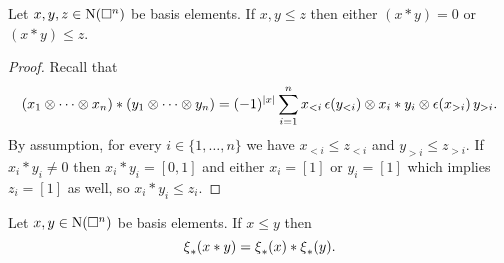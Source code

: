 \begin{lemma}
	Let $x, y, z \in \operatorname{N}(\square^n)$ be basis elements.
	If $x, y \leq z$ then either $(x \ast y) = 0$ or $(x \ast y) \leq z$.
\end{lemma}

\begin{proof}
	Recall that
	\begin{align*}
	(x_1 \otimes \cdots \otimes x_n) \ast (y_1 \otimes \cdots \otimes y_n) =
	(-1)^{|x|} \sum_{i=1}^n x_{<i}\, \epsilon(y_{<i}) \otimes x_i \ast y_i \otimes \epsilon(x_{>i}) \, y_{>i}.
	\end{align*}
	By assumption, for every $i \in \{1, \dots, n\}$ we have $x_{<i} \leq z_{<i}$ and $y_{>i} \leq z_{>i}$.
	If $x_i \ast y_i \neq 0$ then $x_i \ast y_i = [0,1]$ and either $x_i = [1]$ or $y_i = [1]$ which implies $z_i = [1]$ as well, so $x_i \ast y_i \leq z_i$.
\end{proof}

\begin{lemma}
	Let $x, y \in \operatorname{N}(\square^n)$ be basis elements.
	If $x \leq y$ then
	\begin{equation} \label{e:cs collapse as algebra map}
	\operatorname{\xi}_\ast(x \ast y) = \operatorname{\xi}_\ast(x) \ast \operatorname{\xi}_\ast(y).
	\end{equation}
\end{lemma}

